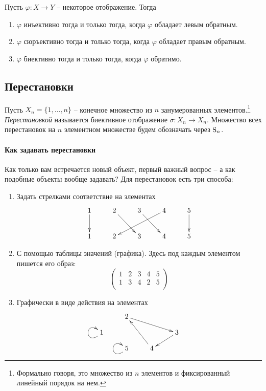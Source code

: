 \begin{claim*}
Пусть $\varphi\colon X\to Y$ -- некоторое отображение. Тогда
\begin{enumerate}
\item $\varphi$ инъективно тогда и только тогда, когда $\varphi$ обладает левым обратным.
\item $\varphi$ сюръективно тогда и только тогда, когда $\varphi$ обладает правым обратным.
\item $\varphi$ биективно тогда и только тогда, когда $\varphi$ обратимо.
\end{enumerate}
\end{claim*}



\subsection{Перестановки}

Пусть $X_n = \{1,\ldots,n\}$ -- конечное множество из $n$ занумерованных элементов.\footnote{Формально говоря, это множество из $n$ элементов и фиксированный линейный порядок на нем.} {\it Перестановкой} называется биективное отображение $\sigma\colon X_n\to X_n$. Множество всех перестановок на $n$ элементном множестве будем обозначать через $\operatorname{S}_{n}$.

\paragraph{Как задавать перестановки} Как только вам встречается новый объект, первый важный вопрос -- а как подобные объекты вообще задавать? Для перестановок есть три способа:
\begin{enumerate}
\item Задать стрелками соответствие на элементах
\[
\xymatrix{
	{1}\ar[d]&{2}\ar[dr]&{3}\ar[dr]&{4}\ar[dll]&{5}\ar[d]\\
	{1}&{2}&{3}&{4}&{5}
}
\]

\item С помощью таблицы значений (графика). Здесь под каждым элементом пишется его образ:
\[
\begin{pmatrix}
{1}&{2}&{3}&{4}&{5}\\
{1}&{3}&{4}&{2}&{5}\\
\end{pmatrix}
\]

\item Графически в виде действия на элементах
\[
\xymatrix@R=10pt{
	{}&{2}\ar[rrd]&{}&{}\\
	{1}\ar@(dl,ul)&{}&{}&{3}\ar[dl]\\
	{}&{5}\ar@(dl,ul)&{4}\ar[luu]&{}
}
\]
\end{enumerate}

